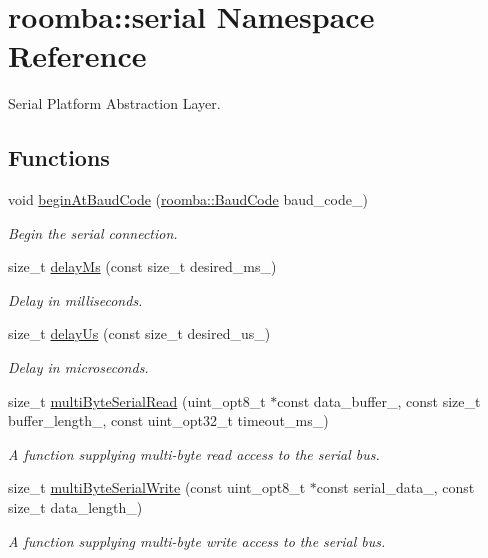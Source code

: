 \hypertarget{namespaceroomba_1_1serial}{\section{roomba\+:\+:serial Namespace Reference}
\label{namespaceroomba_1_1serial}
}


Serial Platform Abstraction Layer.  


\subsection*{Functions}
\begin{DoxyCompactItemize}
\item 
void \hyperlink{namespaceroomba_1_1serial_a13ea2776b1b20987eac4980cdc194eb5}{begin\+At\+Baud\+Code} (\hyperlink{namespaceroomba_a303ba447b12fc77bc24977a1a7ec6d6c}{roomba\+::\+Baud\+Code} baud\+\_\+code\+\_\+)
\begin{DoxyCompactList}\small\item\em Begin the serial connection. \end{DoxyCompactList}\item 
size\+\_\+t \hyperlink{namespaceroomba_1_1serial_af8bd9971043c83114088d1c43cfd97d4}{delay\+Ms} (const size\+\_\+t desired\+\_\+ms\+\_\+)
\begin{DoxyCompactList}\small\item\em Delay in milliseconds. \end{DoxyCompactList}\item 
size\+\_\+t \hyperlink{namespaceroomba_1_1serial_af7b2e2fc2ec29829a0d72f091d36dcd3}{delay\+Us} (const size\+\_\+t desired\+\_\+us\+\_\+)
\begin{DoxyCompactList}\small\item\em Delay in microseconds. \end{DoxyCompactList}\item 
size\+\_\+t \hyperlink{namespaceroomba_1_1serial_a5f09086cb2b546c2aa5dbd354d981d85}{multi\+Byte\+Serial\+Read} (uint\+\_\+opt8\+\_\+t $\ast$const data\+\_\+buffer\+\_\+, const size\+\_\+t buffer\+\_\+length\+\_\+, const uint\+\_\+opt32\+\_\+t timeout\+\_\+ms\+\_)
\begin{DoxyCompactList}\small\item\em A function supplying multi-\/byte read access to the serial bus. \end{DoxyCompactList}\item 
size\+\_\+t \hyperlink{namespaceroomba_1_1serial_a5700ad1549232f61cdcecfdf8f480cf3}{multi\+Byte\+Serial\+Write} (const uint\+\_\+opt8\+\_\+t $\ast$const serial\+\_\+data\+\_\+, const size\+\_\+t data\+\_\+length\+\_\+)
\begin{DoxyCompactList}\small\item\em A function supplying multi-\/byte write access to the serial bus. \end{DoxyCompactList}\end{DoxyCompactItemize}


